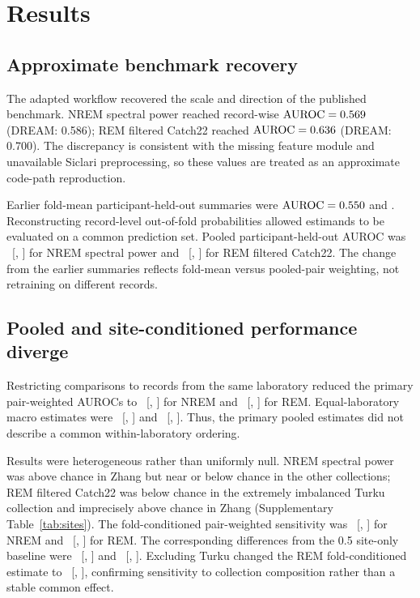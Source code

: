 \documentclass[10pt,twocolumn]{article}
\newcommand{\AUC}{\mathrm{AUROC}}
\begin{document}
\section{Results}

\subsection{Approximate benchmark recovery}

The adapted workflow recovered the scale and direction of the published
benchmark. NREM spectral power reached record-wise $\AUC=\NremRandomAUC$
(DREAM: 0.586); REM filtered Catch22 reached $\AUC=\RemRandomAUC$ (DREAM:
0.700). The discrepancy is consistent with the missing feature module and
unavailable Siclari preprocessing, so these values are treated as an
approximate code-path reproduction.

Earlier fold-mean participant-held-out summaries were
$\AUC=\NremLegacyParticipantAUC$ and \RemLegacyParticipantAUC. Reconstructing
record-level out-of-fold probabilities allowed estimands to be evaluated on a
common prediction set. Pooled participant-held-out AUROC was
\NremPooledAUC\ [\NremPooledLow, \NremPooledHigh] for NREM spectral power and
\RemPooledAUC\ [\RemPooledLow, \RemPooledHigh] for REM filtered Catch22. The
change from the earlier summaries reflects fold-mean versus pooled-pair
weighting, not retraining on different records.

\subsection{Pooled and site-conditioned performance diverge}

Restricting comparisons to records from the same laboratory reduced the
primary pair-weighted AUROCs to \NremWithinPairAUC\ [\NremWithinPairLow,
\NremWithinPairHigh] for NREM and \RemWithinPairAUC\ [\RemWithinPairLow,
\RemWithinPairHigh] for REM. Equal-laboratory macro estimates were
\NremSiteMacroAUC\ [\NremSiteMacroLow, \NremSiteMacroHigh] and
\RemSiteMacroAUC\ [\RemSiteMacroLow, \RemSiteMacroHigh]. Thus, the primary
pooled estimates did not describe a common within-laboratory ordering.

Results were heterogeneous rather than uniformly null. NREM spectral power
was above chance in Zhang but near or below chance in the other collections;
REM filtered Catch22 was below chance in the extremely imbalanced Turku
collection and imprecisely above chance in Zhang (Supplementary
Table~\ref{tab:sites}). The fold-conditioned pair-weighted sensitivity was
\NremFoldWithinPairAUC\ [\NremFoldWithinPairLow, \NremFoldWithinPairHigh] for
NREM and \RemFoldWithinPairAUC\ [\RemFoldWithinPairLow,
\RemFoldWithinPairHigh] for REM. The corresponding differences from the
0.5 site-only baseline were \NremFoldDelta\ [\NremFoldDeltaLow,
\NremFoldDeltaHigh] and \RemFoldDelta\ [\RemFoldDeltaLow,
\RemFoldDeltaHigh]. Excluding Turku changed the REM fold-conditioned estimate
to \RemNoTurkuFoldWithinPairAUC\ [\RemNoTurkuFoldWithinPairLow,
\RemNoTurkuFoldWithinPairHigh], confirming sensitivity to collection
composition rather than a stable common effect.
\end{document}
